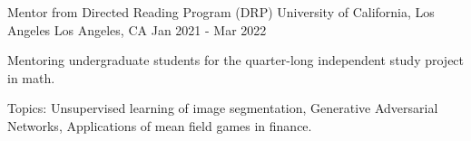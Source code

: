 \begin{cventries}
  \cventry
    {Mentor from Directed Reading Program (DRP)} %
    {University of California, Los Angeles} %
    {Los Angeles, CA} %
    {Jan 2021 - Mar 2022} %
    {
      \begin{cvitems} %
        \item Mentoring undergraduate students for the quarter-long independent study project in math.
        \item Topics: Unsupervised learning of image segmentation, Generative Adversarial Networks, Applications of mean field games in finance.
      \end{cvitems}
    }

\end{cventries}
\endgroup
